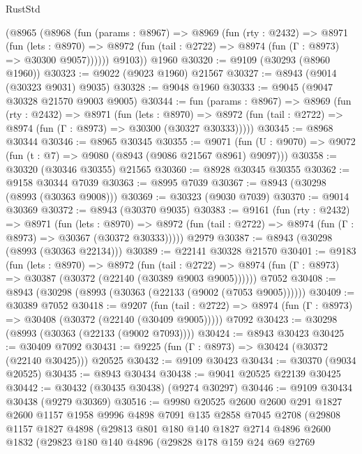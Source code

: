 \begin{lexlean}{RustStd}
\begin{coremodule}
      (@8965
        (@8968
          (fun (params : @8967) =>
          @8969
            (fun (rty : @2432) =>
            @8971
              (fun (lets : @8970) =>
              @8972 (fun (tail : @2722) => @8974 (fun (Γ : @8973) => @30300 @9057))))))
        @9103))
    @1960
@30320 := @9109 (@30293 (@8960 @1960))
@30323 := @9022 (@9023 @1960) @21567
@30327 := @8943 (@9014 (@30323 @9031) @9035)
@30328 := @9048 @1960
@30333 := @9045 (@9047 @30328 @21570 @9003 @9005)
@30344 := fun (params : @8967) =>
  @8969
    (fun (rty : @2432) =>
    @8971
      (fun (lets : @8970) =>
      @8972 (fun (tail : @2722) => @8974 (fun (Γ : @8973) => @30300 (@30327 @30333)))))
@30345 := @8968 @30344
@30346 := @8965 @30345
@30355 := @9071
    (fun (U : @9070) => @9072 (fun (t : @7) => @9080 (@8943 (@9086 @21567 @8961) @9097)))
@30358 := @30320 (@30346 @30355) @21565
@30360 := @8928 @30345 @30355
@30362 := @9158 @30344 @7039
@30363 := @8995 @7039
@30367 := @8943 (@30298 (@8993 (@30363 @9008)))
@30369 := @30323 (@9030 @7039)
@30370 := @9014 @30369
@30372 := @8943 (@30370 @9035)
@30383 := @9161
    (fun (rty : @2432) =>
    @8971
      (fun (lets : @8970) =>
      @8972 (fun (tail : @2722) => @8974 (fun (Γ : @8973) => @30367 (@30372 @30333)))))
    @2979
@30387 := @8943 (@30298 (@8993 (@30363 @22134)))
@30389 := @22141 @30328 @21570
@30401 := @9183
    (fun (lets : @8970) =>
    @8972
      (fun (tail : @2722) =>
      @8974 (fun (Γ : @8973) => @30387 (@30372 (@22140 (@30389 @9003 @9005))))))
    @7052
@30408 := @8943 (@30298 (@8993 (@30363 (@22133 (@9002 (@7053 @9005))))))
@30409 := @30389 @7052
@30418 := @9207
    (fun (tail : @2722) => @8974 (fun (Γ : @8973) => @30408 (@30372 (@22140 (@30409 @9005)))))
    @7092
@30423 := @30298 (@8993 (@30363 (@22133 (@9002 @7093))))
@30424 := @8943 @30423
@30425 := @30409 @7092
@30431 := @9225 (fun (Γ : @8973) => @30424 (@30372 (@22140 @30425))) @20525
@30432 := @9109 @30423
@30434 := @30370 (@9034 @20525)
@30435 := @8943 @30434
@30438 := @9041 @20525 @22139 @30425
@30442 := @30432 (@30435 @30438) (@9274 @30297)
@30446 := @9109 @30434 @30438 (@9279 @30369)
@30516 := @9980
    @20525
    @2600
    @2600
    @291
    @1827
    @2600
    @1157
    @1958
    @9996
    @4898
    @7091
    @135
    @2858
    @7045
    @2708
    (@29808
      @1157
      @1827
      @4898
      (@29813
        @801
        @180
        @140
        @1827
        @2714
        @4896
        @2600
        @1832
        (@29823
          @180
          @140
          @4896
          (@29828
            @178
            @159
            @24
            @69
            @2769

\end{coremodule}
\end{lexlean}

